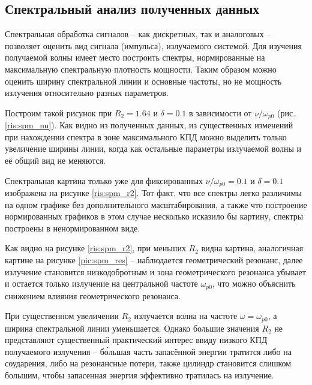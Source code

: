 \subsection{Спектральный анализ полученных данных}

Спектральная обработка сигналов -- как дискретных, так и аналоговых -- позволяет оценить вид сигнала (импульса), излучаемого системой. Для изучения получаемой волны имеет место построить спектры, нормированные на максимальную спектральную плотность мощности. Таким образом можно оценить ширину спектральной линии и основные частоты, но не мощность излучения относительно разных параметров. 

Построим такой рисунок при $R_{2}=1.64$ и $\delta=0.1$ в зависимости от $\nu/\omega_{p0}$ (рис.\ref{ris:spm_nu}).
Как видно из полученных данных, из существенных изменений при нахождении спектра в зоне максимального КПД можно выделить только увеличение ширины линии, когда как остальные параметры излучаемой волны и её общий вид не меняются.

Спектральная картина только уже для фиксированных $\nu/\omega_{p 0}=0.1$ и $\delta=0.1$ изображена на рисунке \ref{ris:spm_r2}. Тот факт, что все спектры легко различимы на одном графике без дополнительного масштабирования, а также что построение нормированных графиков в этом случае несколько исказило бы картину, спектры построены в ненормированном виде.


Как видно на рисунке \ref{ris:spm_r2}, при меньших $R_{2}$ видна картина, аналогичная картине на рисунке \ref{pic:spm_res} -- наблюдается геометрический резонанс, далее излучение становится низкодобротным и зона геометрического резонанса убывает и остается только излучение на центральной частоте $\omega_{p0}$, что можно объяснить снижением влияния геометрического резонанса. 

При существенном увеличении $R_{2}$ излучается волна на частоте $\omega=\omega_{p0}$, а ширина спектральной линии уменьшается. Однако большие значения $R_{2}$ не представляют существенный практический интерес ввиду низкого КПД получаемого излучения -- б\'ольшая часть запасённой энергии тратится либо на соударения, либо на резонансные потери, также цилиндр становится слишком большим, чтобы запасенная энергия эффективно тратилась на излучение.